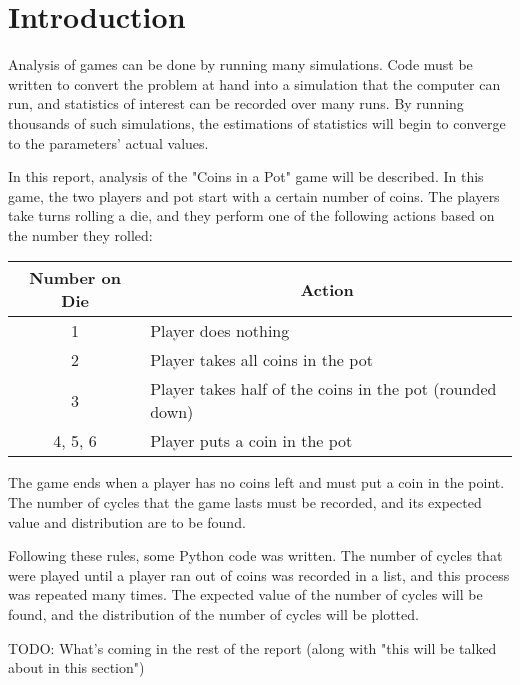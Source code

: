 \section{Introduction}

Analysis of games can be done by running many simulations. Code must be written to convert the problem at hand into a simulation that the computer can run, and statistics of interest can be recorded over many runs. By running thousands of such simulations, the estimations of statistics will begin to converge to the parameters' actual values.

In this report, analysis of the "Coins in a Pot" game will be described. In this game, the two players and pot start with a certain number of coins. The players take turns rolling a die, and they perform one of the following actions based on the number they rolled:

\begin{table}[H]
\centering
\begin{tabular}{|c|l|}
\hline
\textbf{Number on Die} & \multicolumn{1}{c|}{\textbf{Action}}                     \\ \hline
1                      & Player does nothing                                      \\ \hline
2                      & Player takes all coins in the pot                        \\ \hline
3                      & Player takes half of the coins in the pot (rounded down) \\ \hline
4, 5, 6                & Player puts a coin in the pot                            \\ \hline
\end{tabular}
\end{table}

The game ends when a player has no coins left and must put a coin in the point. The number of cycles that the game lasts must be recorded, and its expected value and distribution are to be found.

Following these rules, some Python code was written. The number of cycles that were played until a player ran out of coins was recorded in a list, and this process was repeated many times. The expected value of the number of cycles will be found, and the distribution of the number of cycles will be plotted.

TODO: What's coming in the rest of the report (along with "this will be talked about in this section")